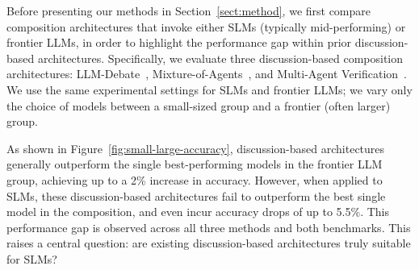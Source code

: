 Before presenting our methods in Section~\ref{sect:method}, we first compare composition architectures that invoke either SLMs (typically mid-performing) or frontier LLMs, in order to highlight the performance gap within prior discussion-based architectures. Specifically, we evaluate three discussion-based composition architectures: LLM-Debate~\citep{du2023improvingfactualityreasoninglanguage}, Mixture-of-Agents~\citep{wang2024mixtureofagentsenhanceslargelanguage}, and Multi-Agent Verification~\citep{lifshitz2025multiagentverificationscalingtesttime}. We use the same experimental settings for SLMs and frontier LLMs; we vary only the choice of models between a small-sized group and a frontier (often larger) group.

As shown in Figure~\ref{fig:small-large-accuracy}, discussion-based architectures generally outperform the single best-performing models in the frontier LLM group, achieving up to a 2\% increase in accuracy. However, when applied to SLMs, these discussion-based architectures fail to outperform the best single model in the composition, and even incur accuracy drops of up to 5.5\%. This performance gap is observed across all three methods and both benchmarks. This raises a central question: are existing discussion-based architectures truly suitable for SLMs?



